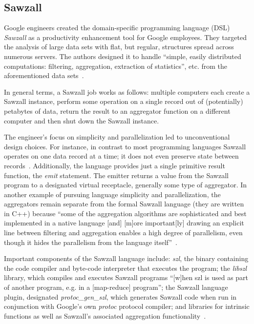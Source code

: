 \pv 

\subsection{Sawzall}

Google engineers created the domain-specific programming language
(DSL) \textit{Sawzall} as a productivity enhancement tool for Google
employees.  They targeted the analysis of large data sets with flat,
but regular, structures spread across numerous servers.  The authors
designed it to handle ``simple, easily distributed computations:
filtering, aggregation, extraction of statistics'', etc. from the
aforementioned data sets~\cite{pike05sawzall}.

     In general terms, a Sawzall job works as follows: multiple
     computers each create a Sawzall instance, perform some operation
     on a single record out of (potentially) petabytes of data, return
     the result to an aggregator function on a different computer and
     then shut down the Sawzall instance.

     The engineer's focus on simplicity and parallelization led to
     unconventional design choices.  For instance, in contrast to most
     programming languages Sawzall operates on one data record at a
     time; it does not even preserve state between
     records~\cite{www-bytemining-sawzall}. Additionally, the language
     provides just a single primitive result function, the \textit{emit}
     statement.  The emitter returns a value from the Sawzall program
     to a designated virtual receptacle, generally some type of
     aggregator.  In another example of pursuing language simplicity
     and parallelization, the aggregators remain separate from the
     formal Sawzall language (they are written in C++) because ``some
     of the aggregation algorithms are sophisticated and best
     implemented in a native language [and] [m]ore important[ly]
     drawing an explicit line between filtering and aggregation
     enables a high degree of parallelism, even though it hides the
     parallelism from the language itself''~\cite{pike05sawzall}.

     Important components of the Sawzall language include: \textit{szl}, the
     binary containing the code compiler and byte-code interpreter
     that executes the program; the \textit{libszl} library, which compiles
     and executes Sawzall programs ``[w]hen szl is used as part of
     another program, e.g. in a [map-reduce] program''; the Sawzall
     language plugin, designated \textit{protoc\_gen\_szl}, which generates
     Sawzall code when run in conjunction with Google's own \textit{protoc}
     protocol compiler; and libraries for intrinsic functions as well
     as Sawzall's associated aggregation
     functionality~\cite{www-google-code-wiki-sawzall}.

